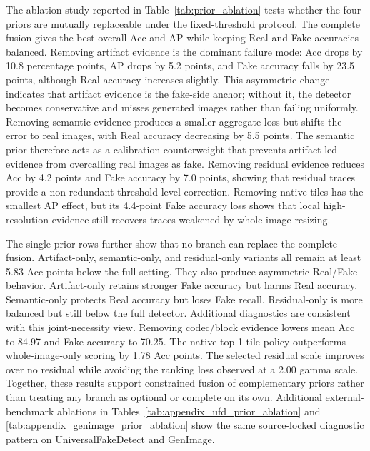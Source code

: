 \documentclass[letterpaper,journal]{IEEEtran}
\begin{document}
The ablation study reported in Table~\ref{tab:prior_ablation} tests whether the four priors are mutually replaceable under the fixed-threshold protocol. The complete fusion gives the best overall Acc and AP while keeping Real and Fake accuracies balanced. Removing artifact evidence is the dominant failure mode: Acc drops by 10.8 percentage points, AP drops by 5.2 points, and Fake accuracy falls by 23.5 points, although Real accuracy increases slightly. This asymmetric change indicates that artifact evidence is the fake-side anchor; without it, the detector becomes conservative and misses generated images rather than failing uniformly. Removing semantic evidence produces a smaller aggregate loss but shifts the error to real images, with Real accuracy decreasing by 5.5 points. The semantic prior therefore acts as a calibration counterweight that prevents artifact-led evidence from overcalling real images as fake. Removing residual evidence reduces Acc by 4.2 points and Fake accuracy by 7.0 points, showing that residual traces provide a non-redundant threshold-level correction. Removing native tiles has the smallest AP effect, but its 4.4-point Fake accuracy loss shows that local high-resolution evidence still recovers traces weakened by whole-image resizing.

The single-prior rows further show that no branch can replace the complete fusion. Artifact-only, semantic-only, and residual-only variants all remain at least 5.83 Acc points below the full setting. They also produce asymmetric Real/Fake behavior. Artifact-only retains stronger Fake accuracy but harms Real accuracy. Semantic-only protects Real accuracy but loses Fake recall. Residual-only is more balanced but still below the full detector. Additional diagnostics are consistent with this joint-necessity view. Removing codec/block evidence lowers mean Acc to 84.97 and Fake accuracy to 70.25. The native top-1 tile policy outperforms whole-image-only scoring by 1.78 Acc points. The selected residual scale improves over no residual while avoiding the ranking loss observed at a 2.00 gamma scale. Together, these results support constrained fusion of complementary priors rather than treating any branch as optional or complete on its own. Additional external-benchmark ablations in Tables~\ref{tab:appendix_ufd_prior_ablation} and \ref{tab:appendix_genimage_prior_ablation} show the same source-locked diagnostic pattern on UniversalFakeDetect and GenImage.
\end{document}
